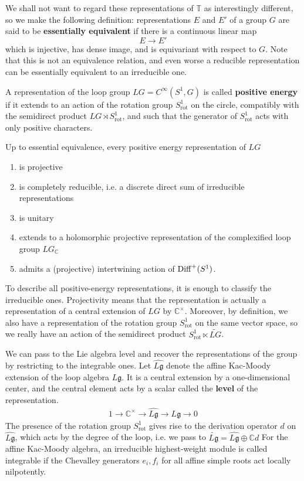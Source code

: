 \documentclass[12pt]{article}
\begin{document}
We shall not want to regard these representations of \(\mathbb T\) as interestingly different, so we make the following definition: representations \(E\) and \(E'\) of a group \(G\) are said to be \textbf{essentially equivalent} if there is a continuous linear map
\[
E\to E'
\]
which is injective, has dense image, and is equivariant with respect to \(G\). Note that this is not an equivalence relation, and even worse a reducible representation can be essentially equivalent to an irreducible one. 

A representation of the loop group
$LG=C^\infty(S^1,G)$
is called \textbf{positive energy} if it extends to an action of the rotation group $S^1_{\mathrm{rot}}$ on the circle, compatibly with the semidirect product $LG\rtimes S^1_{\mathrm{rot}}$, and such that the generator of $S^1_{\mathrm{rot}}$ acts with only positive characters.

\begin{theorem}
    Up to essential equivalence, every positive energy representation of $LG$ \begin{enumerate}
        \item is projective
        \item is completely reducible, i.e. a discrete direct sum of irreducible
representations
    \item is unitary
    \item extends to a holomorphic projective representation of the complexified loop group $L G_{\mathbb C}$
    \item admits a (projective) intertwining action of $\operatorname{Diff}^+(S^1)$.
    \end{enumerate}
\end{theorem}

To describe all positive-energy representations, it is enough to classify the irreducible ones. Projectivity means that the representation is actually a representation of a central extension of $LG$ by $\mathbb C^\times$. Moreover, by definition, we also have a representation of the rotation group $S^1_{\mathrm{rot}}$ on the same vector space, so we really have an action of the semidirect product $S^1_{\mathrm{rot}}\ltimes \widetilde{LG}$.

We can pass to the Lie algebra level and recover the representations of the group by restricting to the integrable ones. Let $\widehat{L\mathfrak g}$ denote the affine Kac-Moody extension of the loop algebra $L\mathfrak g$. It is a central extension by a one-dimensional center, and the central element acts by a scalar called the \textbf{level} of the representation.
\begin{align*}
    1\to \mathbb C^\times \to \widehat{L\mathfrak g} \to L\mathfrak g \to 0
\end{align*}
The presence of the rotation group $S^1_{\mathrm{rot}}$ gives rise to the derivation operator $d$ on $\widehat{L\mathfrak g}$, which acts by the degree of the loop, i.e. we pass to $\widetilde{L\mathfrak g}
=
\widehat{L\mathfrak g}\oplus \mathbb C d$
For the affine Kac-Moody algebra, an irreducible highest-weight module is called integrable if the Chevalley generators $e_i,f_i$ for all affine simple roots act locally nilpotently. 
\end{document}
